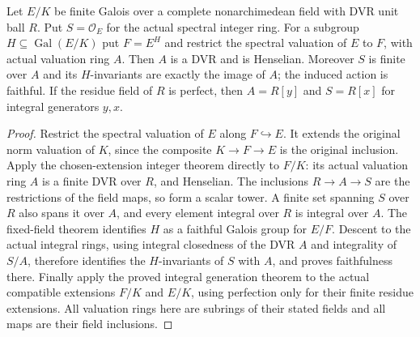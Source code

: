 \begin{lemma}
\label{fw:fixed-field-integers}
\leanok
Let $E/K$ be finite Galois over a complete nonarchimedean field with
DVR unit ball $R$. Put $S=\mathcal O_E$ for the actual spectral integer
ring. For a subgroup $H\subseteq\operatorname{Gal}(E/K)$ put $F=E^H$
and restrict the spectral valuation of $E$ to $F$, with actual
valuation ring $A$. Then $A$ is a DVR and is Henselian. Moreover $S$
is finite over $A$ and its $H$-invariants are exactly the image of $A$;
the induced action is faithful. If the residue field of $R$ is perfect,
then $A=R[y]$ and $S=R[x]$ for integral generators $y,x$.
\end{lemma}
\begin{proof}
Restrict the spectral valuation of $E$ along $F\hookrightarrow E$.
It extends the original norm valuation of $K$, since the composite
$K\to F\to E$ is the original inclusion. Apply the chosen-extension
integer theorem directly to $F/K$: its actual valuation ring $A$
is a finite DVR over $R$, and Henselian.
The inclusions $R\to A\to S$ are the restrictions of the field maps,
so form a scalar tower. A finite set spanning $S$ over $R$ also spans
it over $A$, and every element integral over $R$ is integral over $A$.
The fixed-field theorem identifies
$H$ as a faithful Galois group for $E/F$. Descent to the actual
integral rings, using integral closedness of the DVR $A$ and integrality
of $S/A$, therefore identifies the $H$-invariants of $S$ with
$A$, and proves faithfulness there. Finally apply the proved integral
generation theorem to the actual compatible extensions $F/K$ and
$E/K$, using perfection only for their finite residue extensions.
All valuation rings here are subrings of their stated fields and all
maps are their field inclusions.
\end{proof}

